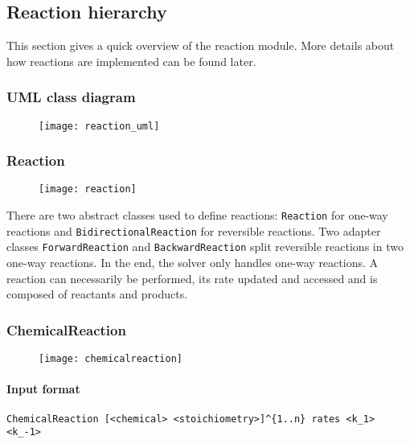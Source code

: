 
\subsection{Reaction hierarchy}

This section gives a quick overview of the reaction module. More details about how reactions are implemented can be found later.

\subsubsection{UML class diagram}

\begin{figure}[!ht]
	\centering
	\texttt{[image: reaction\_uml]}
\end{figure}

\subsubsection{Reaction}

\begin{figure}[!ht]
	\centering
	\texttt{[image: reaction]}
\end{figure}

There are two abstract classes used to define reactions: \texttt{Reaction} for one-way reactions and \texttt{BidirectionalReaction} for reversible reactions. Two adapter classes \texttt{ForwardReaction} and \texttt{BackwardReaction} split reversible reactions in two one-way reactions. In the end, the solver only handles one-way reactions. A reaction can necessarily be performed, its rate updated and accessed and is composed of reactants and products.

\subsubsection{ChemicalReaction}

\begin{figure}[!ht]
	\centering
	\texttt{[image: chemicalreaction]}
\end{figure}

\paragraph{Input format}
\begin{verbatim}
ChemicalReaction [<chemical> <stoichiometry>]^{1..n} rates <k_1> <k_-1>
\end{verbatim}

